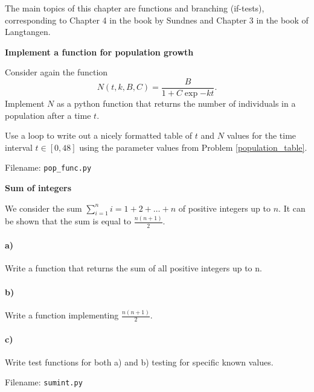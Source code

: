 The main topics of this chapter are functions and branching (if-tests), corresponding
to Chapter 4 in the book by Sundnes and Chapter 3 in the book of Langtangen.


\begin{Problem}{\textbf{Implement a function for population growth}}

\noindent Consider again the function
\begin{equation*}
N(t, k, B, C) = \frac{B}{1 + C \exp{-kt}}.
\end{equation*}
Implement $N$ as a python function 
that returns the number of individuals in a population after a time $t$.

Use a  loop to write out a nicely formatted table of $t$ and $N$ values
for the time interval $t \in [0, 48]$ using the parameter values from Problem \ref{population_table}.

Filename: \texttt{pop\_func.py}
\end{Problem}


\begin{Problem}{\textbf{Sum of integers}}

\noindent We consider the sum $\sum_{i = 1}^n i=1+2+\dots+n$ of positive integers up to $n$.
It can be shown that the sum is equal to $\frac{n(n+1)}{2}$.

\paragraph{a)}
Write a function  that returns the sum of all positive
integers up to n.

\paragraph{b)}
Write a function implementing $\frac{n(n+1)}{2}$.

\paragraph{c)}
Write test functions for both a) and b) testing for specific known values.

Filename: \texttt{sumint.py}
\end{Problem}


